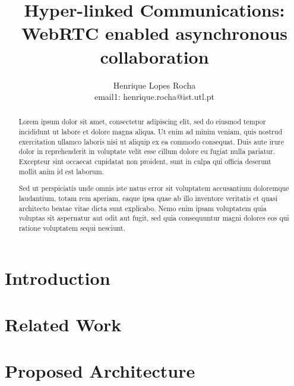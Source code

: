 \documentclass{llncs}
\begin{document}
\pagestyle{plain}
\mainmatter              %

\title{Hyper-linked Communications: WebRTC enabled asynchronous collaboration}
\author{%
	Henrique Lopes Rocha \\
	email1: henrique.rocha@ist.utl.pt \\
}

\maketitle              %

\begin{abstract}

Lorem ipsum dolor sit amet, consectetur adipiscing elit, sed do eiusmod tempor incididunt ut labore et dolore magna aliqua. Ut enim ad minim veniam, quis nostrud exercitation ullamco laboris nisi ut aliquip ex ea commodo consequat. Duis aute irure dolor in reprehenderit in voluptate velit esse cillum dolore eu fugiat nulla pariatur. Excepteur sint occaecat cupidatat non proident, sunt in culpa qui officia deserunt mollit anim id est laborum.

Sed ut perspiciatis unde omnis iste natus error sit voluptatem accusantium doloremque laudantium, totam rem aperiam, eaque ipsa quae ab illo inventore veritatis et quasi architecto beatae vitae dicta sunt explicabo. Nemo enim ipsam voluptatem quia voluptas sit aspernatur aut odit aut fugit, sed quia consequuntur magni dolores eos qui ratione voluptatem sequi nesciunt.

\end{abstract}

\section{Introduction}
  

\section{Related Work}\label{related}
  
  
  
  

\section{Proposed Architecture}\label{arch} %
  
\end{document}
